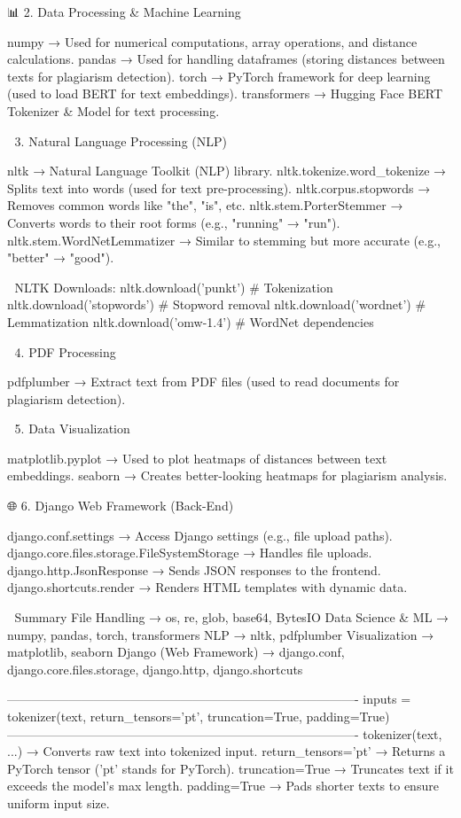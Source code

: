 📊 2. Data Processing & Machine Learning

numpy →	Used for numerical computations, array operations, and distance calculations.
pandas →	Used for handling dataframes (storing distances between texts for plagiarism detection).
torch →	PyTorch framework for deep learning (used to load BERT for text embeddings).
transformers →	Hugging Face BERT Tokenizer & Model for text processing.

📄 3. Natural Language Processing (NLP)

nltk →	Natural Language Toolkit (NLP) library.
nltk.tokenize.word_tokenize →	Splits text into words (used for text pre-processing).
nltk.corpus.stopwords →	Removes common words like "the", "is", etc.
nltk.stem.PorterStemmer →	Converts words to their root forms (e.g., "running" → "run").
nltk.stem.WordNetLemmatizer →	Similar to stemming but more accurate (e.g., "better" → "good").

🔹 NLTK Downloads:
nltk.download('punkt')      # Tokenization
nltk.download('stopwords')  # Stopword removal
nltk.download('wordnet')    # Lemmatization
nltk.download('omw-1.4')    # WordNet dependencies

📜 4. PDF Processing

pdfplumber →	Extract text from PDF files (used to read documents for plagiarism detection).

🎨 5. Data Visualization

matplotlib.pyplot →	Used to plot heatmaps of distances between text embeddings.
seaborn →	Creates better-looking heatmaps for plagiarism analysis.

🌐 6. Django Web Framework (Back-End)

django.conf.settings →	Access Django settings (e.g., file upload paths).
django.core.files.storage.FileSystemStorage →	Handles file uploads.
django.http.JsonResponse →	Sends JSON responses to the frontend.
django.shortcuts.render →	Renders HTML templates with dynamic data.

🚀 Summary
File Handling → os, re, glob, base64, BytesIO
Data Science & ML → numpy, pandas, torch, transformers
NLP → nltk, pdfplumber
Visualization → matplotlib, seaborn
Django (Web Framework) → django.conf, django.core.files.storage, django.http, django.shortcuts

-------------------------------------------------------------------------------------
inputs = tokenizer(text, return_tensors='pt', truncation=True, padding=True)
-------------------------------------------------------------------------------------
tokenizer(text, ...) → Converts raw text into tokenized input.
return_tensors='pt' → Returns a PyTorch tensor ('pt' stands for PyTorch).
truncation=True → Truncates text if it exceeds the model's max length.
padding=True → Pads shorter texts to ensure uniform input size.

